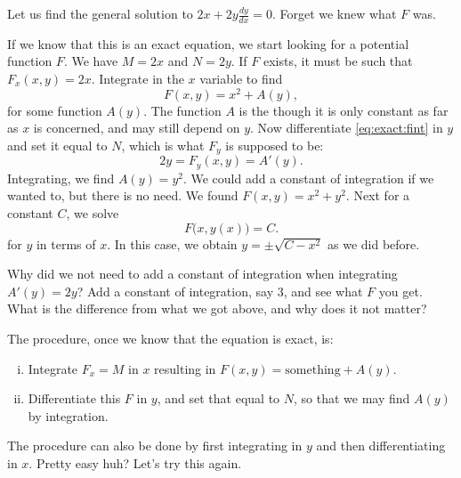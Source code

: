 \begin{example}
Let us find the general solution to
$2x + 2y \frac{dy}{dx} = 0$.  Forget we knew
what $F$ was.

If we know that this is an exact equation, we start looking for a potential
function $F$.
We have $M = 2x$ and $N=2y$.
If $F$ exists, it must be such that
$F_x (x,y) = 2x$.
Integrate in the $x$ variable to find
\begin{equation} \label{eq:exact:fint}
F(x,y) = x^2 + A(y) ,
\end{equation}
for some function $A(y)$.  The function $A$ is the  though it is only constant as far as $x$ is concerned, and
may still depend on $y$.  Now differentiate \eqref{eq:exact:fint} in $y$ 
and set it equal to $N$, which is what $F_y$ is supposed to be:
\begin{equation*}
2y = F_y (x,y) = A'(y) .
\end{equation*}
Integrating, we find $A(y) = y^2$.  We could add a constant of integration
if we wanted to, but there is no need.  We found $F(x,y) = x^2+y^2$.
Next for a constant $C$, we solve
\begin{equation*}
F\bigl(x,y(x)\bigr) = C .
\end{equation*}
for $y$ in terms of $x$.  In this case, we obtain $y = \pm \sqrt{C-x^2}$
as we did before.
\end{example}

\begin{exercise}
Why did we not need to add a constant of integration when integrating $A'(y)
= 2y$?  Add a constant of integration, say $3$, and see what $F$ you get.
What is the difference from what we got above, and why does it not matter?
\end{exercise}



The procedure, once we know that the equation is exact, is:
\begin{enumerate}[(i)]
\item Integrate $F_x = M$ in $x$ resulting in $F(x,y) = \text{something} + A(y)$.
\item Differentiate this $F$ in $y$, and set that equal to
$N$, so that we may find $A(y)$ by integration.
\end{enumerate}
The procedure can also be done by first integrating in $y$ and then
differentiating in $x$.
Pretty easy huh?  Let's try this again.

